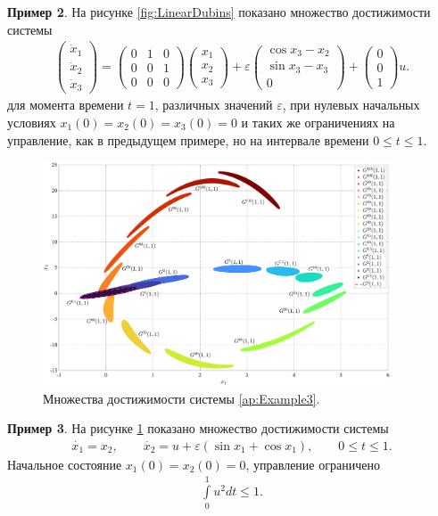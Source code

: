 \documentclass[../main.tex]{subfiles}
\begin{document}
 	 \textbf{Пример 2}. На рисунке \ref{fig:LinearDubins} показано множество достижимости системы 
 \begin{gather}\label{ap:Linear+Dubins}
 	\begin{pmatrix} 
 		\dot{x}_1 \\
 		\dot{x}_2 \\ 
 		\dot{x}_3 \end{pmatrix} = 
 	\begin{pmatrix}
 		0 & 1 & 0 \\
 		0 & 0 & 1 \\
 		0 & 0 & 0
 	\end{pmatrix}
 	\begin{pmatrix} 
 		x_1 \\
 		x_2 \\ 
 		x_3 \end{pmatrix} + 
 	\varepsilon
 	\begin{pmatrix}
 		\cos x_3 - x_2\\
 		\sin x_3 - x_3 \\
 		0
 	\end{pmatrix} + 
 	\begin{pmatrix}
 		0 \\ 0 \\ 1
 	\end{pmatrix} u.
 \end{gather}
 	для момента времени $t = 1$, различных значений $\varepsilon$, при нулевых начальных условиях $x_1(0) = x_2(0) = x_3(0) = 0 $ и таких же ограничениях на управление, как в предыдущем примере, но на интервале времени $0 \leqslant t \leqslant 1$.
 	
 	\begin{figure}[t]
 		\centering
 			\includegraphics[width=0.92\textwidth]{images/Osipov_QuaziLinearExp.eps}
 		\caption{Множества достижимости системы \eqref{ap:Example3}.}
 		\label{ap:fig:QuaziLinearExp}
 	\end{figure}
 
 \textbf{Пример 3}. На рисунке \ref{ap:fig:QuaziLinearExp} показано множество достижимости системы 
 \begin{gather}\label{ap:Example3}
 	\dot{x_1} = x_2, \qquad
 	\dot{x_2} = u + \varepsilon(\sin x_1 + \cos x_1),\qquad 0\leqslant t \leqslant 1.
 \end{gather}
 Начальное состояние $x_1(0) = x_2(0) = 0 $, управление ограничено 
 \begin{gather}\label{example3_controls}
 	\int\limits_0^1 u^2dt \leqslant 1.
 \end{gather}
 
\end{document}
